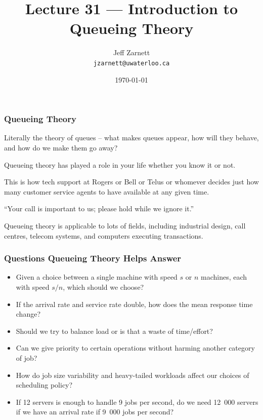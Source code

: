 

\title{Lecture 31 --- Introduction to Queueing Theory}

\author{Jeff Zarnett\\ \small \texttt{jzarnett@uwaterloo.ca}}
\date{\today}




\begin{frame}
  \titlepage

 \end{frame}



\begin{frame}
\frametitle{Queueing Theory}

Literally the theory of queues -- what makes queues appear, how will they behave, and how do we make them go away? 


Queueing theory has played a role in your life whether you know it or not. 

This is how tech support at Rogers or Bell or Telus or whomever decides just how many customer service agents to have available at any given time. 

``Your call is important to us; please hold while we ignore it.''

Queueing theory is applicable to lots of fields, including industrial design, call centres, telecom systems, and computers executing transactions. 

\end{frame}



\begin{frame}
\frametitle{Questions Queueing Theory Helps Answer}

\begin{itemize}
 \item Given a choice between a single machine with speed $s$ or $n$ machines, each with speed $s/n$, which should we choose?
 \item If the arrival rate and service rate double, how does the mean response time change?
 \item Should we try to balance load or is that a waste of time/effort?
 \item Can we give priority to certain operations without harming another category of job?
 \item How do job size variability and heavy-tailed workloads affect our choices of scheduling policy?
 \item If 12 servers is enough to handle 9 jobs per second, do we need 12~000 servers if we have an arrival rate if 9~000 jobs per second?
\end{itemize}

\end{frame}



